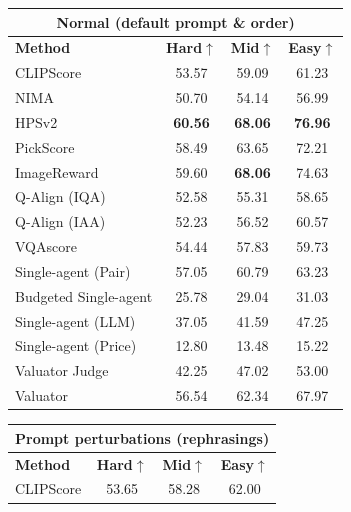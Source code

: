 \begin{table}[t]
\centering
\scriptsize
\setlength{\tabcolsep}{2.7pt}
\renewcommand{\arraystretch}{0.9}

\begin{minipage}[t]{0.32\textwidth}
\centering
\begin{tabular}{lccc}
\toprule
\multicolumn{4}{c}{\textbf{Normal (default prompt \& order)}}\\
\midrule
\textbf{Method} & \textbf{Hard}$\uparrow$ & \textbf{Mid}$\uparrow$ & \textbf{Easy}$\uparrow$ \\
\midrule
CLIPScore                    & 53.57 & 59.09 & 61.23 \\
NIMA                         & 50.70 & 54.14 & 56.99 \\
HPSv2                        & \textbf{60.56} & \textbf{68.06} & \textbf{76.96} \\
PickScore                    & 58.49 & 63.65 & 72.21 \\
ImageReward                  & 59.60 & \textbf{68.06} & 74.63 \\
Q-Align (IQA)                & 52.58 & 55.31 & 58.65 \\
Q-Align (IAA)                & 52.23 & 56.52 & 60.57 \\
VQAscore                     & 54.44 & 57.83 & 59.73 \\
\midrule
Single-agent (Pair)          & 57.05 & 60.79 & 63.23 \\
Budgeted Single-agent        & 25.78 & 29.04 & 31.03 \\
Single-agent (LLM)           & 37.05 & 41.59 & 47.25 \\
Single-agent (Price)         & 12.80 & 13.48 & 15.22 \\
Valuator Judge               & 42.25 & 47.02 & 53.00 \\
Valuator                     & 56.54 & 62.34 & 67.97 \\
\bottomrule
\end{tabular}
\end{minipage}\hfill
\begin{minipage}[t]{0.32\textwidth}
\centering
\begin{tabular}{lccc}
\toprule
\multicolumn{4}{c}{\textbf{Prompt perturbations (rephrasings)}}\\
\midrule
\textbf{Method} & \textbf{Hard}$\uparrow$ & \textbf{Mid}$\uparrow$ & \textbf{Easy}$\uparrow$ \\
\midrule
CLIPScore                    & 53.65 & 58.28 & 62.00 \\

\end{tabular}
\end{minipage}
\end{table}
